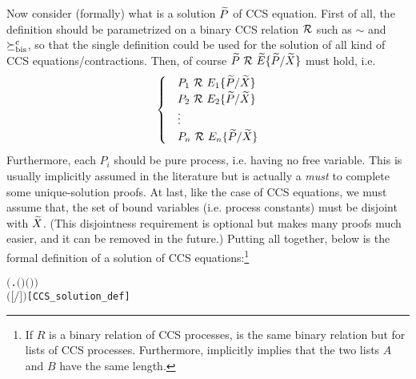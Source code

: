 Now consider (formally) what is a solution $\widetilde P$ of CCS equation. First of
all, the definition should be parametrized on a binary CCS
relation ${\cal R}$ such as $\sim$ and $\mathrel{\succeq^{\rm{c}}_{\rm{bis}}}$, so that the single definition
could be used for the solution of all kind of CCS
equations/contractions. Then, of course ${\widetilde P} \ {\cal R}\  {\widetilde E}\{\widetilde
P/\widetilde X\}$ must hold, i.e.
\begin{equation*}
  \begin{cases}
    &P_1 \ {\cal R}\ E_1\{\widetilde P/\widetilde X\} \\
    &P_2 \ {\cal R}\ E_2\{\widetilde P/\widetilde X\} \\
    & \vdots \\
    &P_n \ {\cal R}\ E_n\{\widetilde P/\widetilde X\}
  \end{cases}
\end{equation*}
Furthermore, each $P_i$ should be pure process, i.e. having no free
variable. This is usually implicitly assumed in the literature but is
actually a \emph{must} to complete some unique-solution proofs.
At last, like the case of CCS equations, we must assume that, the
set of bound variables (i.e. process constants) must be disjoint with
$\widetilde X$. (This disjointness requirement is optional but makes many proofs much
easier, and it can be removed in the future.) Putting all together,
below is the formal definition of a solution of \multivariate CCS
equations:\footnote{If $R$ is a binary relation of CCS processes,
   is the same binary relation but for lists of
  CCS processes. Furthermore,  implicitly
  implies that the two lists $A$ and $B$ have the same length.}
\begin{alltt}
   \HOLTokenTurnstile{}      \HOLSymConst{\HOLTokenEquiv{}}
        \HOLSymConst{\HOLTokenConj{}}  \ensuremath{(}\HOLTokenLambda{}.  \ensuremath{(} \ensuremath{)} \ensuremath{(} \ensuremath{)}\ensuremath{)}  \HOLSymConst{\HOLTokenConj{}}
         \ensuremath{(} \ensuremath{[}\ensuremath{/}\ensuremath{]} \ensuremath{)}\hfill{[CCS_solution_def]}
\end{alltt}


